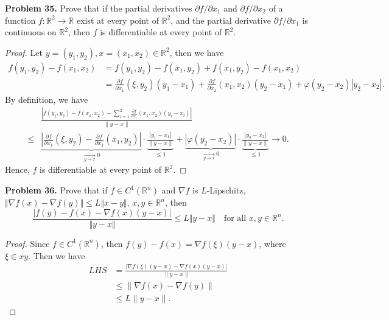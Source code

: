 \documentclass[12pt,leqno]{amsart}
\theoremstyle{definition}
\begin{document}
\medskip

\noindent
{\bf Problem 35.}
Prove that if the partial derivatives $\partial f/\partial x_1$ and $\partial f/\partial x_2$  of a function $f:\mathbb{R}^2\to\mathbb{R}$ exist at every point of
$\mathbb{R}^2$, and the partial derivative $\partial f/\partial x_1$ is continuous on $\mathbb{R}^2$, then $f$ is differentiable at every point of $\mathbb{R}^2$.
\begin{proof}
Let $y = (y_1, y_2), x = (x_1, x_2) \in \mathbb{R}^2$, then we have
\begin{align*}
    f(y_1, y_2) - f(x_1, x_2) & = f(y_1, y_2) - f(x_1, y_2) + f(x_1, y_2) - f(x_1, x_2) \\
    & = \frac{\partial f}{\partial x_1}(\xi, y_2) (y_1 - x_1) + \frac{\partial f}{\partial x_2}(x_1,x_2)(y_2 - x_1) + \varphi(y_2 - x_2)|y_2 - x_2|.
\end{align*}
By definition, we have
\begin{align*}
    & \frac{\left|f(y_1, y_2) - f(x_1, x_2) - \sum^2_{i=1}\frac{\partial f}{\partial x_i}(x_1, x_2)(y_i - x_i) \right|}{\|y - x\|} \\
    \leq & \underbrace{\left|\frac{\partial f}{\partial x_1}(\xi, y_2) - \frac{\partial f}{\partial x_1}(x_1, y_2)\right|}_{\xrightarrow[y\to x]{} 0}\cdot \underbrace{\frac{|y_1 - x_1|}{\|y - x\|}}_{\leq 1} + \underbrace{|\varphi(y_2 - x_2)|}_{\xrightarrow[y\to x]{} 0} \cdot \underbrace{\frac{|y_2 - x_2|}{\|y - x\|}}_{\leq 1} \to 0.
\end{align*}
Hence, $f$ is differentiable at every point of $\mathbb{R}^2$.
\end{proof}

\medskip

\noindent
{\bf Problem 36.}
Prove that if $f\in C^1(\mathbb{R}^n)$ and $\nabla f$ is $L$-Lipschitz, $\Vert \nabla f(x)-\nabla f(y)\Vert\leq L\Vert x-y\Vert$, $x,y\in\mathbb{R}^n$, then
$$
\frac{|f(y)-f(x)-\nabla f(x)(y-x)|}{\Vert y-x\Vert}\leq L\Vert y-x\Vert
\quad
\text{for all $x,y\in\mathbb{R}^n$.}
$$
\begin{proof}
Since $f\in C^1(\mathbb{R}^n)$, then $f(y) - f(x) = \nabla f(\xi)(y - x)$, where $\xi \in \overline{xy}$. Then we have
\begin{align*}
    LHS & = \frac{\left|\nabla f(\xi)(y - x) - \nabla f(x)(y-x) \right|}{\|y-x\|} \\
    & \leq \| \nabla f(x)-\nabla f(y)\|  \\
    & \leq L \|y-x\|.
\end{align*}
\end{proof}
\end{document}
